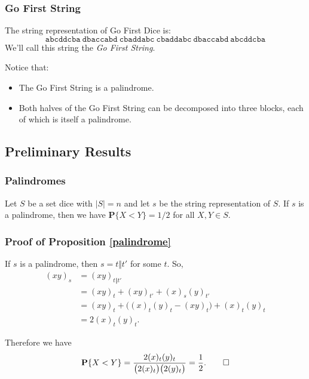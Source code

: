 \documentclass[aspectratio=169]{beamer}
\begin{document}
\begin{frame}[triangle=siiblue]
\frametitle{Go First String}
The string representation of Go First Dice is:
\begin{equation*}
	\texttt{abcddcba} \ \texttt{dbaccabd} \ \texttt{cbaddabc} \  \texttt{cbaddabc} \ \texttt{dbaccabd} \ \texttt{abcddcba}
\end{equation*}
We'll call this string the \emph{Go First String}.

\vfill

Notice that:
\begin{itemize}
	\item The Go First String is a palindrome.  
	\item Both halves of the Go First String can be decomposed into three blocks, each of which is itself a palindrome.
\end{itemize}
\end{frame}

\subsection{Preliminary Results}
\begin{frame}[triangle=siiblue]
\frametitle{Palindromes}
\begin{siiproposition}[label=palindrome]{}{}
Let $S$ be a set dice with $|S| = n$ and let $s$ be the string representation of $S$.  If $s$ is a palindrome,  then we have $\mathbf{P}\{X < Y\} = 1/2$ for all $X,Y \in S$. 
\end{siiproposition}
\end{frame}

\begin{frame}[triangle=siiblue]
\frametitle{Proof of Proposition \ref{palindrome}}
If $s$ is a palindrome, then $s = t \Vert t'$ for some $t$.  So, 
\begin{equation}\nonumber
\begin{split}
(xy)_s &= (xy)_{t \Vert t'} \\
&= (xy)_t + (xy)_{t'} + (x)_s(y)_{t'} \\
&= (xy)_t + \big((x)_t(y)_t - (xy)_t\big) + (x)_t(y)_t \\
&= 2(x)_t(y)_t.
\end{split}
\end{equation}

\vfill

Therefore we have
\begin{equation*}
\mathbf{P}\{X < Y\} = \frac{2(x)_t(y)_t}{\big(2(x)_t\big)\big(2(y)_t\big)} = \frac{1}{2}.  \qed
\end{equation*}
\end{frame}
\end{document}

